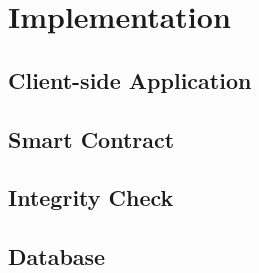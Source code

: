\section{Implementation}
\label{sec:approach-implementation}

	\subsection{Client-side Application}
	\label{subsec:approach-implementation-client}

	\subsection{Smart Contract}
	\label{subsec:approach-implementation-sc}

	\subsection{Integrity Check}
	\label{subsec:approach-implementation-integrity}

	\subsection{Database}
	\label{subsec:approach-implementation-database}
